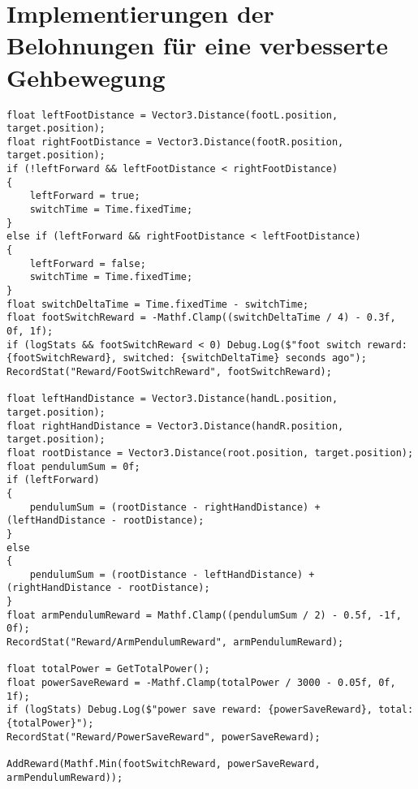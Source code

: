 \section{Implementierungen der Belohnungen für eine verbesserte Gehbewegung}
\label{code:gehbewegung_belohnung}
\begin{lstlisting}[caption={Implementierung von zusätzliche Belohnungen für Gehbewegungsanpassungen},captionpos=b,label={lst:skript_gehbewegungsbelohnungen}]
float leftFootDistance = Vector3.Distance(footL.position, target.position);
float rightFootDistance = Vector3.Distance(footR.position, target.position);
if (!leftForward && leftFootDistance < rightFootDistance)
{
    leftForward = true;
    switchTime = Time.fixedTime;
}
else if (leftForward && rightFootDistance < leftFootDistance)
{
    leftForward = false;
    switchTime = Time.fixedTime;
}
float switchDeltaTime = Time.fixedTime - switchTime;
float footSwitchReward = -Mathf.Clamp((switchDeltaTime / 4) - 0.3f, 0f, 1f);
if (logStats && footSwitchReward < 0) Debug.Log($"foot switch reward: {footSwitchReward}, switched: {switchDeltaTime} seconds ago");
RecordStat("Reward/FootSwitchReward", footSwitchReward);

float leftHandDistance = Vector3.Distance(handL.position, target.position);
float rightHandDistance = Vector3.Distance(handR.position, target.position);
float rootDistance = Vector3.Distance(root.position, target.position);
float pendulumSum = 0f;
if (leftForward)
{
    pendulumSum = (rootDistance - rightHandDistance) + (leftHandDistance - rootDistance);
}
else
{
    pendulumSum = (rootDistance - leftHandDistance) + (rightHandDistance - rootDistance);
}
float armPendulumReward = Mathf.Clamp((pendulumSum / 2) - 0.5f, -1f, 0f);
RecordStat("Reward/ArmPendulumReward", armPendulumReward);

float totalPower = GetTotalPower();
float powerSaveReward = -Mathf.Clamp(totalPower / 3000 - 0.05f, 0f, 1f);
if (logStats) Debug.Log($"power save reward: {powerSaveReward}, total: {totalPower}");
RecordStat("Reward/PowerSaveReward", powerSaveReward);

AddReward(Mathf.Min(footSwitchReward, powerSaveReward, armPendulumReward));
\end{lstlisting}

\label{code:imitation_belohnung}
